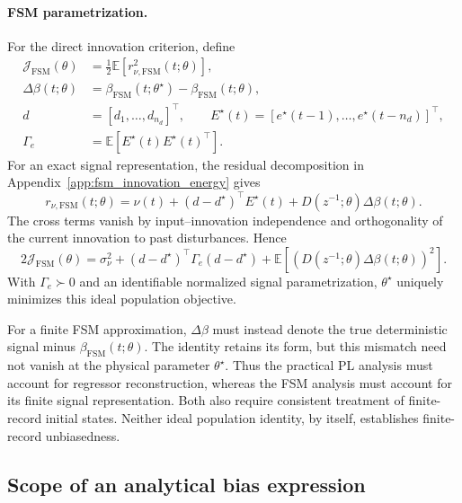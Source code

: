 \paragraph{FSM parametrization.}
For the direct innovation criterion, define
\begin{align}
\label{eq:bias_population_objective}
 \mathcal J_{\mathrm{FSM}}(\theta)
 &=\frac12\mathbb E[r_{\nu,\mathrm{FSM}}^2(t;\theta)],\\
\label{eq:bias_population_definitions}
 \Delta\beta(t;\theta)
 &=\beta_{\mathrm{FSM}}(t;\theta^\star)
       -\beta_{\mathrm{FSM}}(t;\theta),\\
 d&=[d_1,\ldots,d_{n_d}]^\top,\qquad
 E^\star(t)=[e^\star(t-1),\ldots,e^\star(t-n_d)]^\top,\nonumber\\
 \Gamma_e&=\mathbb E[E^\star(t)E^\star(t)^\top].\nonumber
\end{align}
For an exact signal representation, the residual decomposition in
Appendix~\ref{app:fsm_innovation_energy} gives
\[
 r_{\nu,\mathrm{FSM}}(t;\theta)
 =\nu(t)+(d-d^\star)^\top E^\star(t)
       +D(z^{-1};\theta)\Delta\beta(t;\theta).
\]
The cross terms vanish by input--innovation independence and
orthogonality of the current innovation to past disturbances. Hence
\begin{equation}
\label{eq:bias_population_identity}
 2\mathcal J_{\mathrm{FSM}}(\theta)
 =\sigma_\nu^2
  +(d-d^\star)^\top\Gamma_e(d-d^\star)
  +\mathbb E\!\left[
    \left(D(z^{-1};\theta)\Delta\beta(t;\theta)\right)^2\right].
\end{equation}
With $\Gamma_e\succ0$ and an identifiable normalized signal
parametrization, $\theta^\star$ uniquely minimizes this ideal
population objective.

For a finite FSM approximation, $\Delta\beta$ must instead denote the
true deterministic signal minus $\beta_{\mathrm{FSM}}(t;\theta)$.
The identity retains its form, but this mismatch need not vanish at
the physical parameter $\theta^\star$. Thus the practical PL analysis
must account for regressor reconstruction, whereas the FSM analysis
must account for its finite signal representation. Both also require
consistent treatment of finite-record initial states. Neither ideal
population identity, by itself, establishes finite-record unbiasedness.

\subsection{Scope of an analytical bias expression}
\label{app:ws_bias_algorithm}

